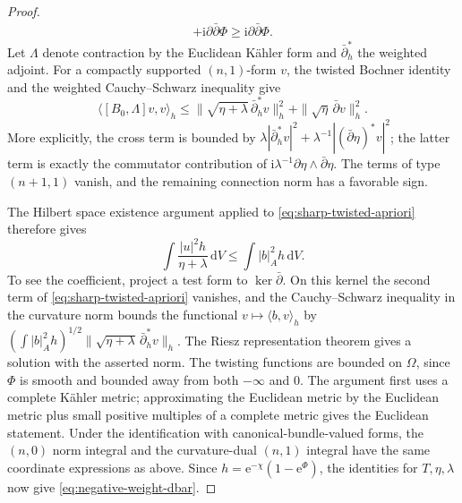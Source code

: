 \begin{proof}
\[\begin{aligned}
        +\mathrm i\partial\bar\partial\Phi
     \geq\mathrm i\partial\bar\partial\Phi.
 \end{aligned}
\]
Let $\Lambda$ denote contraction by the Euclidean K\"ahler form and $\bar\partial_h^*$ the weighted adjoint. For a compactly supported $(n,1)$-form $v$, the twisted Bochner identity and the weighted Cauchy--Schwarz inequality give
\begin{equation}\label{eq:sharp-twisted-apriori}
 \langle[B_0,\Lambda]v,v\rangle_h
 \leq\|\sqrt{\eta+\lambda}\,\bar\partial_h^*v\|_h^2
       +\|\sqrt\eta\,\bar\partial v\|_h^2.
\end{equation}
More explicitly, the cross term is bounded by $\lambda|\bar\partial_h^*v|^2+\lambda^{-1}|(\bar\partial\eta)^*v|^2$; the latter term is exactly the commutator contribution of $\mathrm i\lambda^{-1}\partial\eta\wedge\bar\partial\eta$. The terms of type $(n+1,1)$ vanish, and the remaining connection norm has a favorable sign.

The Hilbert space existence argument applied to \eqref{eq:sharp-twisted-apriori} therefore gives
\[
 \int\frac{|u|^2h}{\eta+\lambda}\,\mathrm{d}V
 \leq\int |b|_A^2h\,\mathrm{d}V.
\]
To see the coefficient, project a test form to $\ker\bar\partial$. On this kernel the second term of \eqref{eq:sharp-twisted-apriori} vanishes, and the Cauchy--Schwarz inequality in the curvature norm bounds the functional $v\mapsto\langle b,v\rangle_h$ by $(\int |b|_A^2h)^{1/2}\|\sqrt{\eta+\lambda}\,\bar\partial_h^*v\|_h$. The Riesz representation theorem gives a solution with the asserted norm. The twisting functions are bounded on $\Omega$, since $\Phi$ is smooth and bounded away from both $-\infty$ and $0$. The argument first uses a complete K\"ahler metric; approximating the Euclidean metric by the Euclidean metric plus small positive multiples of a complete metric gives the Euclidean statement. Under the identification with canonical-bundle-valued forms, the $(n,0)$ norm integral and the curvature-dual $(n,1)$ integral have the same coordinate expressions as above. Since $h=\mathrm e^{-\chi}(1-\mathrm e^\Phi)$, the identities for $T,\eta,\lambda$ now give \eqref{eq:negative-weight-dbar}.


\end{proof}
